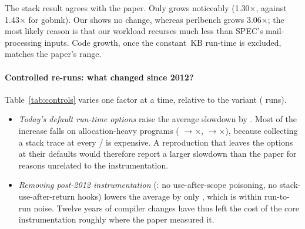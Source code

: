 The stack result agrees with the paper. Only  grows noticeably
(1.30$\times$, against 1.43$\times$ for gobmk). Our  shows no change,
whereas perlbench grows 3.06$\times$; the most likely reason is that our
workload recurses much less than SPEC's mail-processing inputs. Code growth,
once the constant \RuntimeKB\,KB run-time is excluded, matches the paper's
range.

\paragraph{Controlled re-runs: what changed since 2012?}
Table~\ref{tab:controls} varies one factor at a time, relative to the
 variant (\CtrlRuns{} runs).
\begin{itemize}
\item \emph{Today's default run-time options} raise the average slowdown by
\CtrlDefDelta. Most of the increase falls on allocation-heavy programs
( \CtrlPapPerl$\rightarrow$\CtrlDefPerl$\times$, 
\CtrlPapLua$\rightarrow$\CtrlDefLua$\times$), because collecting a stack trace
at every / is expensive. A reproduction that leaves the
options at their defaults would therefore report a larger slowdown than the
paper for reasons unrelated to the instrumentation.
\item \emph{Removing post-2012 instrumentation} (: no
use-after-scope poisoning, no stack-use-after-return hooks) lowers the average
by only \CtrlLeanDelta, which is within run-to-run noise. Twelve years of
compiler changes have thus left the cost of the core instrumentation roughly
where the paper measured it.
\end{itemize}

\begin{table}[h]
\centering\small
\caption{Controlled re-runs: slowdown (mean $\pm$ s.d., \CtrlRuns{} runs) and
memory increase (total peak RSS). ``paper opts'' =  build with the
paper's options; ``default opts'' = same binary with today's defaults; ``lean
build'' = without use-after-scope and stack-use-after-return
instrumentation. Raw data: .}\label{tab:controls}

\end{table}

